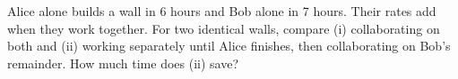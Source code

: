 Alice alone builds a wall in 6 hours and Bob alone in 7 hours. Their rates add when they work together. For two identical walls, compare (i) collaborating on both and (ii) working separately until Alice finishes, then collaborating on Bob's remainder. How much time does (ii) save?
